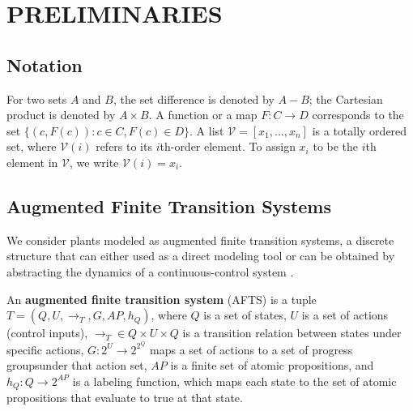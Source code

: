 \section{PRELIMINARIES}
\label{sec:pre}
\subsection{Notation}

For two sets $ A $ and $ B $, the set difference is denoted by $ A-B $; the Cartesian product is denoted by $ A\times B $. A function or a map $ F: C\rightarrow D $ corresponds to  the set $ \{(c,F(c)):c\in C, F(c)\in D \} $. A list $ \mathcal{V}=[x_1,...,x_n] $ is a totally ordered set, where $ \mathcal{V}(i) $ refers to its $ i $th-order element. To assign $ x_i $ to be the $ i $th element in	 $ \mathcal{V} $, we write $ \mathcal{V}(i) = x_i $. %

\subsection{Augmented Finite Transition Systems}

We consider plants modeled as augmented finite transition systems, a discrete structure that can either used as a direct modeling tool or can be obtained by abstracting the dynamics of a continuous-control system \cite{Nilsson2017}.

\begin{definition}
	An \textbf{augmented finite transition system} (AFTS) is a tuple $ T = (Q,U,\rightarrow_T, G,AP,h_Q) $, where $ Q $ is a set of states, $U$ is a set of actions (control inputs), $ \rightarrow_T\in Q\times U \times Q $ is a transition relation between states under specific actions, $ G: 2^U\rightarrow 2^{2^Q} $ maps a set of actions to a set of progress groups\footnotemark under that action set, $ AP $ is a finite set of atomic propositions, and $ h_Q: Q\rightarrow 2^{AP} $ is a labeling function, which maps each state to the set of atomic propositions that evaluate to true at that state. 
\end{definition}

